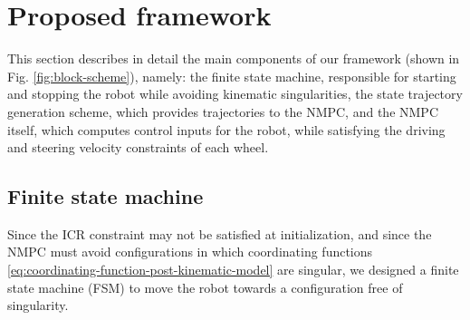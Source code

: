 \section{Proposed framework}
\label{sec:proposed-framework}
This section describes in detail the main components of our framework
(shown in Fig. \ref{fig:block-scheme}), namely: the finite state machine,
responsible for starting and stopping the robot while avoiding kinematic
singularities, the state trajectory generation scheme, which provides
trajectories to the NMPC, and the NMPC itself, which computes control inputs
for the robot, while satisfying the driving and steering velocity constraints
of each wheel.

\subsection{Finite state machine}
\label{sec:finite-state-machine}
Since the ICR constraint may not be satisfied at initialization, and since the
NMPC must avoid configurations in which coordinating functions
\eqref{eq:coordinating-function-post-kinematic-model} are singular, we
designed a finite state machine (FSM) to move the robot towards a configuration
free of singularity.

